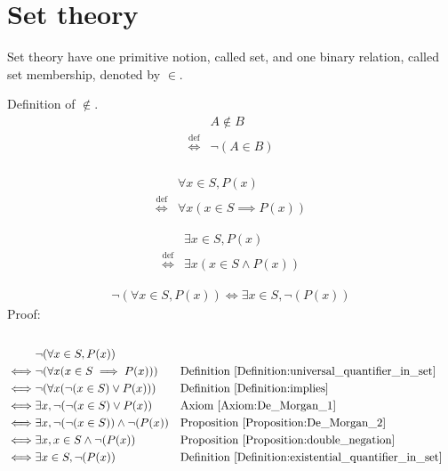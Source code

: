\chapter{Set theory}
Set theory have one primitive notion, called set, and one binary relation, called set membership, denoted by $\in$.

\begin{defn}
\label{Definition:notin}
Definition of $\notin$.
\begin{align*}
& A \notin B \\
\overset{\operatorname{def}}{\iff} & \lnot (A \in B) \\
\end{align*}
\end{defn}

\begin{defn}
\label{Definition:universal_quantifier_in_set}
\begin{align*}
& \forall x \in S, P(x) \\
\overset{\operatorname{def}}{\iff} & \forall x (x \in S \implies P(x))
\end{align*}
\end{defn}

\begin{defn}
\label{Definition:existential_quantifier_in_set}
\begin{align*}
& \exists x \in S, P(x) \\
\overset{\operatorname{def}}{\iff} & \exists x (x \in S \land P(x))
\end{align*}
\end{defn}

\begin{prop}
\begin{align*}
\lnot (\forall x \in S, P(x)) \iff \exists x \in S, \lnot (P(x))
\end{align*}
Proof: \\ \\
\begin{align*}
& \lnot (\forall x \in S, P(x)) \\
\iff & \lnot ( \forall x (x \in S \implies P(x)) )
&& \text{Definition \ref{Definition:universal_quantifier_in_set}} \\
\iff & \lnot ( \forall x (\lnot(x \in S) \lor P(x)) )
&& \text{Definition \ref{Definition:implies}} \\
\iff & \exists x, \lnot (\lnot(x \in S) \lor P(x))
&& \text{Axiom \ref{Axiom:De_Morgan_1}} \\
\iff & \exists x, \lnot (\lnot(x \in S)) \land \lnot (P(x))
&& \text{Proposition \ref{Proposition:De_Morgan_2}} \\
\iff & \exists x, x \in S \land \lnot (P(x))
&& \text{Proposition \ref{Proposition:double_negation}} \\
\iff & \exists x \in S, \lnot (P(x))
&& \text{Definition \ref{Definition:existential_quantifier_in_set}} \\
\end{align*}
\end{prop}

